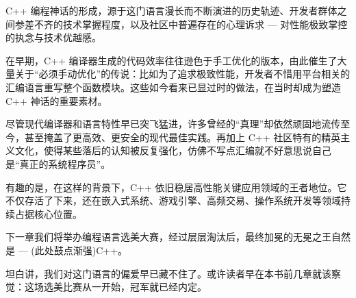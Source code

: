 C++ 编程神话的形成，源于这门语言漫长而不断演进的历史轨迹、开发者群体之间参差不齐的技术掌握程度，以及社区中普遍存在的心理诉求 --- 对性能极致掌控的执念与技术优越感。

在早期，C++ 编译器生成的代码效率往往逊色于手工优化的版本，由此催生了大量关于“必须手动优化”的传说：比如为了追求极致性能，开发者不惜用平台相关的汇编语言重写整个函数模块。这些如今看来已显过时的做法，在当时却成为塑造 C++ 神话的重要素材。

尽管现代编译器和语言特性早已突飞猛进，许多曾经的“真理”却依然顽固地流传至今，甚至掩盖了更高效、更安全的现代最佳实践。再加上 C++ 社区特有的精英主义文化，使得某些落后的认知被反复强化，仿佛不写点汇编就不好意思说自己是“真正的系统程序员”。

有趣的是，在这样的背景下，C++ 依旧稳居高性能关键应用领域的王者地位。它不仅存活了下来，还在嵌入式系统、游戏引擎、高频交易、操作系统开发等领域持续占据核心位置。

下一章我们将举办编程语言选美大赛，经过层层淘汰后，最终加冕的无冕之王自然是 --- (此处鼓点渐强)C++。

坦白讲，我们对这门语言的偏爱早已藏不住了。或许读者早在本书前几章就该察觉：这场选美比赛从一开始，冠军就已经内定。